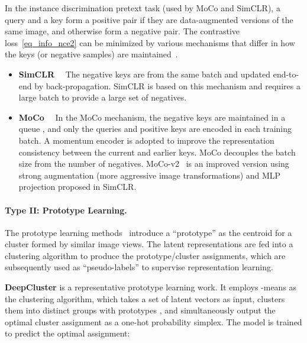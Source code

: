 \documentclass[10pt,twocolumn,letterpaper]{article}
\begin{document}
In the instance discrimination pretext task (used by MoCo and SimCLR), a query and a key form a positive pair if they are data-augmented versions of the same image, and otherwise form a negative pair.
The contrastive loss~\eqref{eq_info_nce2} can be minimized by various
mechanisms that differ in how the keys (or negative samples) are maintained~\cite{chen2020improved}.

\begin{itemize}\vspace{1mm}
    \item {\bf SimCLR}~\cite{chen2020simple}~ The negative keys are from the same batch and updated end-to-end by back-propagation. SimCLR is based on this
mechanism and requires a large batch to provide a large set
of negatives. 
    \vspace{-0mm}
    \item  {\bf MoCo}~\cite{he2020momentum,chen2020improved}~
In the MoCo mechanism, the negative keys are maintained in a queue , and only the queries and positive keys are encoded in each training batch. A momentum encoder is adopted to improve the representation consistency between the current and earlier keys. MoCo decouples the batch size from the number of negatives. MoCo-v2~\cite{chen2020improved} is an improved version using strong augmentation (\ie more aggressive image transformations) and MLP projection proposed in SimCLR.
    \vspace{-6mm}
\end{itemize}

\paragraph{Type II: Prototype Learning.}
The prototype learning methods~\cite{caron2018deepcluster,li2020prototypical,caron2020unsupervised} introduce a ``prototype'' as the centroid for a cluster formed by similar image views. 
The latent representations are fed into a clustering algorithm to produce the prototype/cluster assignments, which are subsequently used as ``pseudo-labels'' to supervise representation learning. 

{\bf  DeepCluster} is a representative prototype learning work. It employs -means as the clustering algorithm, which takes a set of latent vectors  as input, clusters them into  distinct groups with prototypes ,  and simultaneously output the optimal cluster assignment  as a one-hot probability simplex. The model is trained to predict the optimal assignment:
\end{document}
